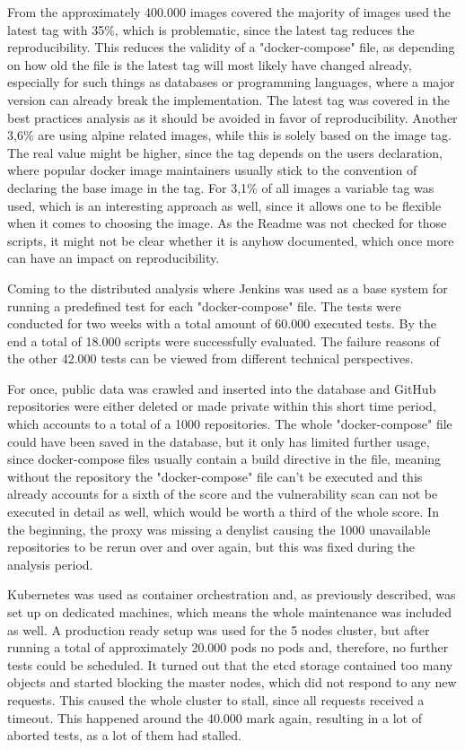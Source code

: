 From the approximately 400.000 images covered the majority of images used the latest tag with 35\%, which is problematic, since the latest tag reduces the reproducibility. This reduces the validity of a "docker-compose" file, as depending on how old the file is the latest tag will most likely have changed already, especially for such things as databases or programming languages, where a major version can already break the implementation. The latest tag was covered in the best practices analysis as it should be avoided in favor of reproducibility.
Another 3,6\% are using alpine related images, while this is solely based on the image tag. The real value might be higher, since the tag depends on the users declaration, where popular docker image maintainers usually stick to the convention of declaring the base image in the tag.
For 3,1\% of all images a variable tag was used, which is an interesting approach as well, since it allows one to be flexible when it comes to choosing the image. As the Readme was not checked for those scripts, it might not be clear whether it is anyhow documented, which once more can have an impact on reproducibility.

Coming to the distributed analysis where Jenkins was used as a base system for running a predefined test for each "docker-compose" file. The tests were conducted for two weeks with a total amount of 60.000 executed tests. By the end a total of 18.000 scripts were successfully evaluated. The failure reasons of the other 42.000 tests can be viewed from different technical perspectives.

For once, public data was crawled and inserted into the database and GitHub repositories were either deleted or made private within this short time period, which accounts to a total of a 1000 repositories. The whole "docker-compose" file could have been saved in the database, but it only has limited further usage, since docker-compose files usually contain a build directive in the file, meaning without the repository the "docker-compose" file can't be executed and this already accounts for a sixth of the score and the vulnerability scan can not be executed in detail as well, which would be worth a third of the whole score. In the beginning, the proxy was missing a denylist causing the 1000 unavailable repositories to be rerun over and over again, but this was fixed during the analysis period.

Kubernetes was used as container orchestration and, as previously described, was set up on dedicated machines, which means the whole maintenance was included as well. A production ready setup was used for the 5 nodes cluster, but after running a total of approximately 20.000 pods no pods and, therefore, no further tests could be scheduled. It turned out that the etcd storage contained too many objects and started blocking the master nodes, which did not respond to any new requests. This caused the whole cluster to stall, since all requests received a timeout. This happened around the 40.000 mark again, resulting in a lot of aborted tests, as a lot of them had stalled.

